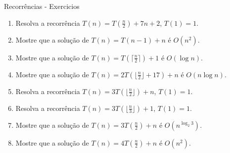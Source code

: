 \documentclass[]{article}
\begin{document}
	\begin{center}
		Recorrências - Exercicios
	\end{center}

\begin{enumerate}
		
		\item Resolva a recorrência $T(n)= T(\frac{n}{2}) + 7n + 2$, $T(1) = 1.$		

		\item Mostre que a solução de $T(n)= T(n - 1) + n$  é $O(n^2).$		

		\item Mostre que a solução de $T(n)= T(\lceil \frac{n}{2} \rceil{}) + 1$  é $O(\log n).$		

		\item Mostre que a solução de $T(n)= 2T(\lfloor \frac{n}{2} \rfloor{} + 17) + n$  é $O(n \log n).$		
	
		\item Resolva a recorrência $T(n)= 3T(\lfloor \frac{n}{2} \rfloor{}) + n$, $T(1) = 1.$		

		\item Resolva a recorrência $T(n)= 3T(\lfloor \frac{n}{3} \rfloor{}) + 1$, $T(1) = 1.$		
		
		\item Mostre que a solução de $T(n)= 3T(\frac{n}{2}) + n$  é $O(n^{\log_{2}{3}}).$	
		
		\item Mostre que a solução de $T(n)= 4T(\frac{n}{2}) + n$  é $O(n^2).$	
		
\end{enumerate}
	
\end{document}
